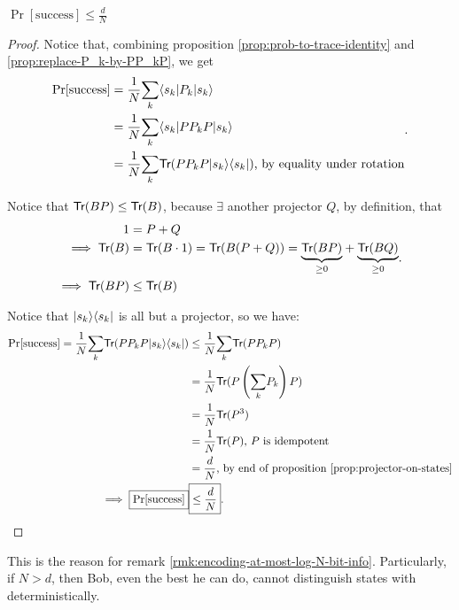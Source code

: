\documentclass[12pt]{article}
\begin{document}
\begin{theorem}
$\Pr[\text{success}]\leq \frac{d}{N}$
\end{theorem}
\begin{proof}
Notice that, combining proposition \ref{prop:prob-to-trace-identity} and \ref{prop:replace-P_k-by-PP_kP}, we get $$
\begin{aligned}
\Pr[\text{success}]
    &= \frac{1}{N}\underset{k}{\sum}\langle s_k| P_k |s_k\rangle\\
    &= \frac{1}{N}\underset{k}{\sum}\langle s_k|P P_k P|s_k\rangle\\
    &= \frac{1}{N}\underset{k}{\sum}\textsf{Tr}(P P_k P|s_k\rangle\langle s_k|)\text{, by equality under rotation}
\end{aligned}.
$$

\noindent Notice that $\textsf{Tr}(BP) \leq \textsf{Tr}(B)$, because $\exists$ another projector $Q$, by definition, that $$
\begin{aligned}
1
    &= P + Q\\
\implies
\textsf{Tr}(B)
    &= \textsf{Tr}(B\cdot 1) = \textsf{Tr}(B(P+Q)) = \underset{\geq 0}{\underbrace{\textsf{Tr}(BP)}} + \underset{\geq 0}{\underbrace{\textsf{Tr}(BQ)}}\\
\implies
\textsf{Tr}(BP)&\leq \textsf{Tr}(B)
\end{aligned}.
$$

\noindent Notice that $|s_k\rangle\langle s_k|$ is all but a projector, so we have: $$
\begin{aligned}
\Pr[\text{success}] = \frac{1}{N}\underset{k}{\sum}\textsf{Tr}(P P_k P|s_k\rangle\langle s_k|)
    &\leq \frac{1}{N}\underset{k}{\sum}\textsf{Tr}(P P_k P)\\
    &= \frac{1}{N}\textsf{Tr}(P \left(\underset{k}{\sum}P_k\right) P)\\
    &= \frac{1}{N}\textsf{Tr}(P^3)\\
    &= \frac{1}{N}\textsf{Tr}(P)\text{, $P$ is idempotent}\\
    &= \frac{d}{N}\text{, by end of proposition \ref{prop:projector-on-states}}\\
\implies
\boxed{\Pr[\text{success}]}
    &\boxed{\leq \frac{d}{N}}.
\end{aligned}
$$
\end{proof}

\begin{corollary}\label{cor:encoding-at-most-log-N-bit-info}
This is the reason for remark \ref{rmk:encoding-at-most-log-N-bit-info}. Particularly, if $N> d$, then Bob, even the best he can do, cannot distinguish states with deterministically.
\end{corollary}
\end{document}

